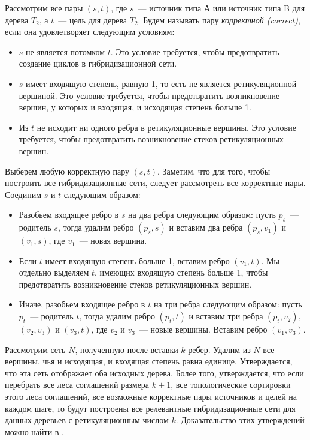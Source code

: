 \documentclass[14pt]{matmex-diploma-custom}
\begin{document}
        Рассмотрим все пары $(s, t)$, где $s$~--- источник типа А или источник типа B для дерева $T_2$, а $t$~--- цель для дерева $T_2$. Будем называть пару \textit{корректной (correct)}, если она удовлетворяет следующим условиям:
        \begin{itemize}
            \item $s$ не является потомком $t$. Это условие требуется, чтобы предотвратить создание циклов в гибридизационной сети.
            \item $s$ имеет входящую степень, равную 1, то есть не является ретикуляционной вершиной. Это условие требуется, чтобы предотвратить возникновение вершин, у которых и входящая, и исходящая степень больше 1.
            \item Из $t$ не исходит ни одного ребра в ретикуляционные вершины. Это условие требуется, чтобы предотвратить возникновение стеков ретикуляционных вершин.
        \end{itemize}
        
        Выберем любую корректную пару $(s, t)$. Заметим, что для того, чтобы построить все гибридизационные сети, следует рассмотреть все корректные пары.
        Соединим $s$ и $t$ следующим образом:
        \begin{itemize}
            \item Разобьем входящее ребро в $s$ на два ребра следующим образом: пусть $p_s$~--- родитель $s$, тогда удалим ребро $(p_s, s)$ и вставим два ребра $(p_s, v_1)$ и $(v_1, s)$, где $v_1$~--- новая вершина.
            \item Если $t$ имеет входящую степень больше 1, вставим ребро $(v_1, t)$. Мы отдельно выделяем $t$, имеющих входящую степень больше 1, чтобы предотвратить возникновение стеков ретикуляционных вершин.
            \item Иначе, разобьем входящее ребро в $t$ на три ребра следующим образом: пусть $p_t$~--- родитель $t$, тогда удалим ребро $(p_t, t)$ и вставим три ребра $(p_t, v_2)$, $(v_2, v_3)$ и $(v_3, t)$, где $v_2$ и $v_3$~--- новые вершины. Вставим ребро $(v_1, v_3)$.
        \end{itemize}
        
        Рассмотрим сеть $N$, полученную после вставки $k$ ребер. Удалим из $N$ все вершины, чья и исходящая, и входящая степень равна единице. Утверждается, что эта сеть отображает оба исходных дерева. Более того, утверждается, что если перебрать все леса соглашений размера $k + 1$, все топологические сортировки этого леса соглашений, все возможные корректные пары источников и целей на каждом шаге, то будут построены все релевантные гибридизационные сети для данных деревьев с ретикуляционным числом $k$. Доказательство этих утверждений можно найти в \cite{ediss19444}.
        
\end{document}

